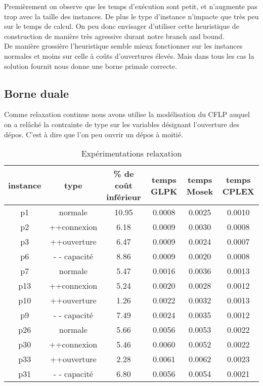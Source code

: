 \documentclass[12pt,a4paper]{article}
\begin{document}
Premièrement on observe que les temps d’exécution sont petit, et n'augmente pas trop avec la taille des instances. De plus le type d'instance n'impacte que très peu sur le temps de calcul. On peu donc envisager d'utiliser cette heuristique de construction de manière très agressive durant notre branch and bound.\\

De manière grossière l'heuristique semble mieux fonctionner sur les instances normales et moins sur celle à coûts d'ouvertures élevés. Mais dans tous les cas la solution fournit nous donne une borne primale correcte. 

\subsection{Borne duale}

Comme relaxation continue nous avons utilise la modélisation du CFLP auquel on a relâché la contrainte de type sur les variables désignant l’ouverture des dépos. C'est à dire que l'on peu ouvrir un dépos à moitié.\\

\begin{table}[!h]
\centering
\begin{tabular}{|c|c|c|c|c|c|}
  \hline
  instance & type & \% de coût inférieur & temps GLPK & temps Mosek & temps CPLEX \\
  \hline
	p1 & normale & 10.95 & 0.0008 & 0.0025 & 0.0010 \\
	p2 & ++connexion & 6.18 & 0.0009 & 0.0030 & 0.0008 \\
	p3 & ++ouverture & 6.47 & 0.0009 & 0.0024 & 0.0007 \\
	p6 & - - capacité & 8.86 & 0.0009 & 0.0020 & 0.0008 \\
  \hline
	p7 & normale & 5.47 & 0.0016 & 0.0036 & 0.0013 \\
	p13 & ++connexion & 5.24 & 0.0020 & 0.0028 & 0.0012 \\
	p10 & ++ouverture & 1.26 & 0.0022 & 0.0032 & 0.0013 \\
	p9 & - - capacité & 7.49 & 0.0024 & 0.0035 & 0.0012 \\
  \hline	
	p26 & normale & 5.66 & 0.0056 & 0.0053 & 0.0022 \\
	p30 & ++connexion & 5.46 & 0.0060 & 0.0052 & 0.0022 \\
	p33 & ++ouverture & 2.28 & 0.0061 & 0.0062 & 0.0023 \\
	p31 & - - capacité & 6.80 & 0.0056 & 0.0054 & 0.0021 \\
  \hline
\end{tabular}
\caption{Expérimentations relaxation}
\label{relax}
\end{table}
\end{document}
